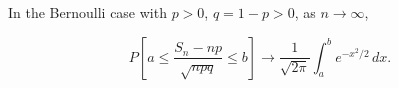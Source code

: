 In the Bernoulli case with $p > 0$, $q = 1-p > 0$, as $n \to \infty$,

$$P\left[a \leq \frac{S_n - np}{\sqrt{npq}} \leq b\right] \to \frac{1}{\sqrt{2\pi}} \int_a^b e^{-x^2/2} \, dx.$$
